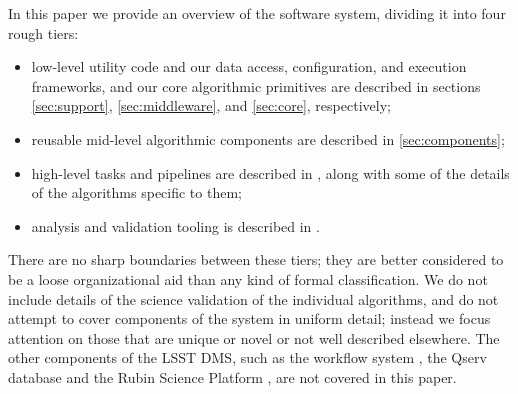 In this paper we provide an overview of the software system, dividing it into four rough tiers:
\begin{itemize}
\item low-level utility code and our data access, configuration, and execution frameworks, and our core algorithmic primitives are described in sections \ref{sec:support}, \ref{sec:middleware}, and \ref{sec:core}, respectively;
\item reusable mid-level algorithmic components are described in \ref{sec:components};
\item high-level tasks and pipelines are described in , along with some of the details of the algorithms specific to them;
\item analysis and validation tooling is described in .
\end{itemize}
There are no sharp boundaries between these tiers; they are better considered to be a loose organizational aid than any kind of formal classification.
We do not include details of the science validation of the individual algorithms, and do not attempt to cover components of the system in uniform detail; instead we focus attention on those that are unique or novel or not well described elsewhere.
The other components of the LSST DMS, such as the workflow system \citep{2022arXiv221115795G,2024EPJWC.29504026K}, the Qserv database \citep{Wang:2011:QDS:2063348.2063364,C15_adassxxxii} and the Rubin Science Platform \citep{LSE-319,2024ASPC..535..227O}, are not covered in this paper.
